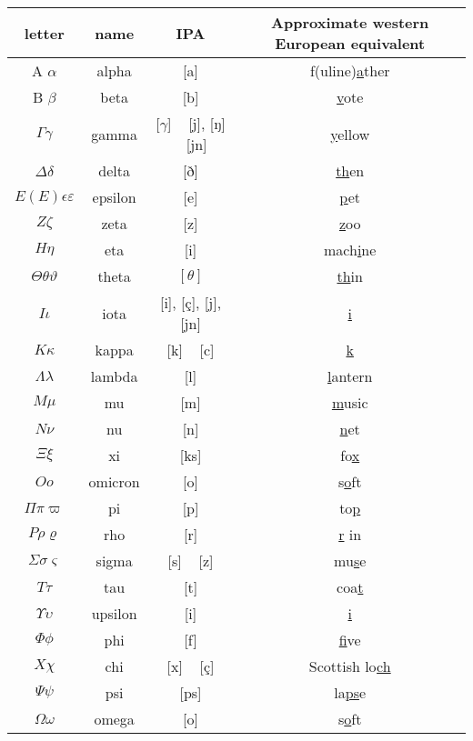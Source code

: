 \documentclass[11pt]{article}
\begin{document}
\begin{tabular}{|c|c|c|c|}
\hline
letter & name & IPA & Approximate western European equivalent \\
\hline
A $\alpha$ & alpha & [a] & f(uline)\uline{a}ther \\
\hline
B $\beta$ & beta & [b] & \uline{v}ote \\
\hline
$\Gamma \gamma$ & gamma & [$\gamma$] ~ [j], [ŋ] ~ [jn] & \uline{y}ellow \\
\hline
$\Delta \delta$ & delta & [ð] & \uline{th}en \\
\hline
$Ε(E) \epsilon \varepsilon$ & epsilon & [e] & \uline{p}et \\
\hline
$Z \zeta$ & zeta & [z] & \uline{z}oo \\
\hline
$H \eta$ & eta & [i] & mach\uline{i}ne \\
\hline
$\Theta \theta \vartheta$ & theta & $[\theta]$ & \uline{th}in \\
\hline
$I \iota$ & iota & [i], [ç], [j], [jn] & \uline{i} \\
\hline
$K \kappa$ & kappa & [k] ~ [c] & \uline{k} \\
\hline
$\Lambda \lambda$ & lambda & [l] & \uline{l}antern \\
\hline
$M \mu$ & mu & [m] & \uline{m}usic \\
\hline
$N \nu$ & nu & [n] & \uline{n}et \\
\hline
$\Xi \xi$ & xi & [ks] & fo\uline{x} \\
\hline
$O o$ & omicron & [o] & s\uline{o}ft \\
\hline
$\Pi \pi \varpi$ & pi & [p] & to\uline{p} \\
\hline
$P \rho \varrho$ & rho & [r] & \uline{r} in \\
\hline
$\Sigma \sigma \varsigma$ & sigma & [s] ~ [z] & mu\uline{s}e \\
\hline
$T \tau$ & tau & [t] & coa\uline{t} \\
\hline
$\Upsilon \upsilon$ & upsilon & [i] & \uline{i} \\
\hline
$\Phi \phi$ & phi & [f] & \uline{f}ive \\
\hline
$X \chi$ & chi & [x] ~ [ç] & Scottish lo\uline{ch} \\
\hline
$\Psi \psi$ & psi & [ps] & la\uline{ps}e \\
\hline
$\Omega \omega$ & omega & [o] & s\uline{o}ft \\
\hline

\end{tabular}
\end{document}
